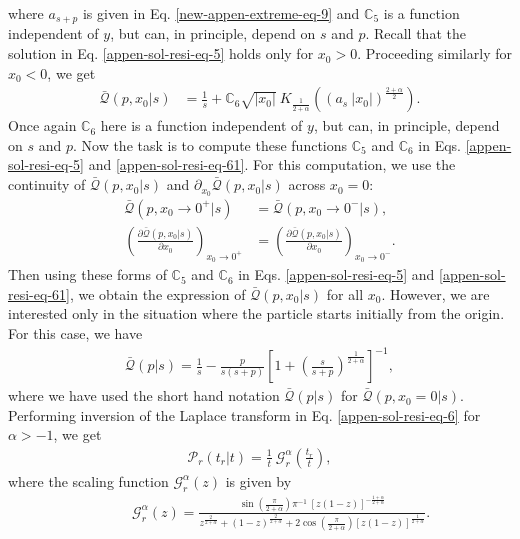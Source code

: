 \documentclass[superscriptaddress,amsmath,amssymb,aps,onecolumn]{revtex4}
\def\greenw#1{{\color{black} #1}}
\begin{document}
where $a_{s+p}$ is given in Eq. \eqref{new-appen-extreme-eq-9} and $\mathbb{C}_5$ is a function independent of $y$, but can, in principle, depend on $s$ and $p$. Recall that the solution in Eq. \eqref{appen-sol-resi-eq-5} holds only for $x_0 >0$. Proceeding similarly for $x_0 <0$, we get
\begin{align}
\bar{\mathcal{Q}}(p,x_0|s) & = \frac{1}{s} +\mathbb{C}_6 \sqrt{|x_0|}~K_{\frac{1}{2+\alpha}} \left( (a_{s}~| x_0|)^{\frac{2+\alpha}{2}}\right).
\label{appen-sol-resi-eq-61}
\end{align}
Once again $\mathbb{C}_6$ here is a function independent of $y$, but can, in principle, depend on $s$ and $p$. Now the task is to compute these functions $\mathbb{C}_5$ and $\mathbb{C}_6$ in Eqs. \eqref{appen-sol-resi-eq-5} and \eqref{appen-sol-resi-eq-61}. For this computation, we use the continuity of $\bar{\mathcal{Q}}(p,x_0|s) $ and $\partial _{x_0} \bar{\mathcal{Q}}(p,x_0|s) $ across $x_0 = 0$:
\begin{align}
\bar{\mathcal{Q}} \left(p,x_0 \to 0^+|s \right)& =\bar{\mathcal{Q}} \left(p,x_0 \to 0^-|s \right), \\
\left( \frac{\partial \bar{\mathcal{Q}} \left(p,x_0|s \right)}{\partial x_0}\right) _{x_0 \to 0^+}& = \left( \frac{\partial \bar{\mathcal{Q}} \left(p,x_0|s \right)}{\partial x_0}\right) _{x_0 \to 0^-}. \label{pras-neww} 
\end{align}
Then using these forms of $\mathbb{C}_5$ and $\mathbb{C}_6$ in Eqs. \eqref{appen-sol-resi-eq-5} and \eqref{appen-sol-resi-eq-61}, we obtain the expression of $\bar{\mathcal{Q}}(p,x_0|s)$ for all $x_0$. However, we are interested only in the situation where the particle starts initially from the origin. For this case, we have
\begin{align}
\bar{\mathcal{Q}}(p|s) = \frac{1}{s}-\frac{p}{s(s+p)} \left[1+ \left( \frac{s}{s+p} \right) ^{\frac{1}{2+\alpha}} \right]^{-1},
\label{appen-sol-resi-eq-6}
\end{align}
where we have used the short hand notation $\bar{\mathcal{Q}}(p|s)$ for $\bar{\mathcal{Q}}(p,x_0=0|s)$. 
Performing inversion of the Laplace transform in Eq. \eqref{appen-sol-resi-eq-6} for $\alpha >-1$, we get \cite{newLamperti58, newCarmi2010}
\begin{align}
\mathcal{P}_r(t_r|t) = \frac{1}{t} ~\mathcal{G} _{r}^{\alpha} \left( \frac{t_r}{t}\right),
\label{new-appen-resi-eq-8}
\end{align}
where the scaling function $\mathcal{G} _{r}^{\alpha} \left( z \right)$ is given by
\begin{align}
& ~~~~~~~~~~\mathcal{G} _{r}^{\alpha} \left( z \right) = \frac{ \sin \left( \frac{\pi}{2+\alpha}\right)  \pi^{-1}~ \left[ z(1-z) \right]^{-\frac{1+\alpha}{2+\alpha}}}{z^{\frac{2}{2+\alpha}}+(1-z)^{\frac{2}{2+\alpha}}+2  \cos \left( \frac{\pi}{2+\alpha}\right) \left[z(1-z) \right] ^{\frac{1}{2+\alpha}}}.
\label{new-appen-resi-eq-9}
\end{align}
\end{document}
